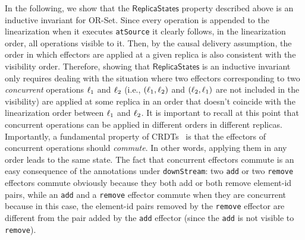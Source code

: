 In the following, we show that the $\mathsf{ReplicaStates}$ property described above is an inductive invariant for OR-Set. Since every operation is appended to the linearization when it executes \lstinline|atSource| it clearly follows, in the linearization order, all operations visible to it. Then, by the causal delivery assumption, the order in which effectors are applied at a given replica is also consistent with the visibility order. 
Therefore, showing that $\mathsf{ReplicaStates}$ is an inductive invariant only requires dealing with the situation where two effectors corresponding to two \emph{concurrent} operations $\ell_1$ and $\ell_2$ (i.e., $(\ell_1,\ell_2)$ and $(\ell_2,\ell_1)$ are not included in the visibility) are applied at some replica in an order that doesn't coincide with the linearization order between $\ell_1$ and $\ell_2$. 
It is important to recall at this point that concurrent operations can be applied in different orders in different replicas. 
Importantly, a fundamental property of CRDTs~\cite{ShapiroPBZ11} is that the effectors of concurrent operations should \emph{commute}. In other words, applying them in any order leads to the same state.
The fact that concurrent effectors commute is an easy consequence of the annotations under \lstinline|downStream|: two {\tt add} or two {\tt remove} effectors commute obviously because they both add or both remove element-id pairs, while an {\tt add} and a {\tt remove} effector commute when they are concurrent because in this case, the element-id pairs removed by the {\tt remove} effector are different from the pair added by the {\tt add} effector (since the {\tt add} is not visible to {\tt remove}).

